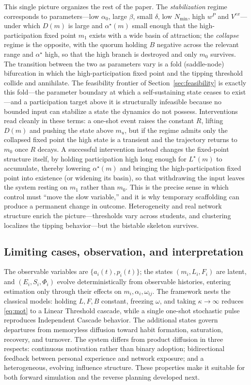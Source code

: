 \documentclass[11pt]{article}
\begin{document}
This single picture organizes the rest of the paper. The \emph{stabilization} regime corresponds to parameters---low $\alpha_0$, large $\beta$, small $\delta$, low $N_{\min}$, high $w^P$ and $V^{ex}$---under which $D(m)$ is large and $\alpha^\star(m)$ small enough that the high-participation fixed point $m_1$ exists with a wide basin of attraction; the \emph{collapse} regime is the opposite, with the quorum holding $B$ negative across the relevant range and $\alpha^\star$ high, so that the high branch is destroyed and only $m_0$ survives. The transition between the two as parameters vary is a fold (saddle-node) bifurcation in which the high-participation fixed point and the tipping threshold collide and annihilate. The feasibility frontier of Section~\ref{sec:feasibility} is exactly this fold---the parameter boundary at which a self-sustaining state ceases to exist---and a participation target above it is structurally infeasible because no bounded input can stabilize a state the dynamics do not possess. Interventions read cleanly in these terms: a one-shot event raises the constant $R$, lifting $D(m)$ and pushing the state above $m_u$, but if the regime admits only the collapsed fixed point the high state is a transient and the trajectory returns to $m_0$ once $R$ decays. A successful intervention instead changes the fixed-point structure itself, by holding participation high long enough for $L^\star(m)$ to accumulate, thereby lowering $\alpha^\star(m)$ and bringing the high-participation fixed point into existence (or widening its basin), so that withdrawing the input leaves the system resting on $m_1$ rather than $m_0$. This is the precise sense in which control must ``move the slow variable,'' and it is why temporary scaffolding can produce a permanent change in outcome. Heterogeneity and real network structure enrich the picture---thresholds vary across students, and clustering localizes the tipping behavior---but the bistable skeleton survives.

\subsection{Limiting cases, observation, and interpretation}\label{sec:nesting}
The observable variables are $\{a_i(t),p_i(t)\}$; the states $(m_i,L_i,F_i)$ are latent, and $(E_i,S_i,\Phi_i)$ evolve deterministically from observable histories, entering estimation only through their effects on $m_i,\alpha_i,\omega_{ij}$. The framework nests the classical models: holding $L,F,B$ constant, freezing $\omega$, and taking $\kappa\to\infty$ reduces \eqref{eq:mot} to a Linear Threshold cascade, while a single one-shot stochastic pulse reproduces Independent Cascade behavior. The additional states govern departures from memoryless diffusion toward habit formation, saturation, recovery, and turnover. The system differs from product diffusion in three respects: continuous motivation rather than binary adoption; bidirectional feedback between personal experience and network exposure; and a heterogeneous, evolving influence structure. These properties make it suitable for both forward simulation and the reverse planning developed next.
\end{document}
